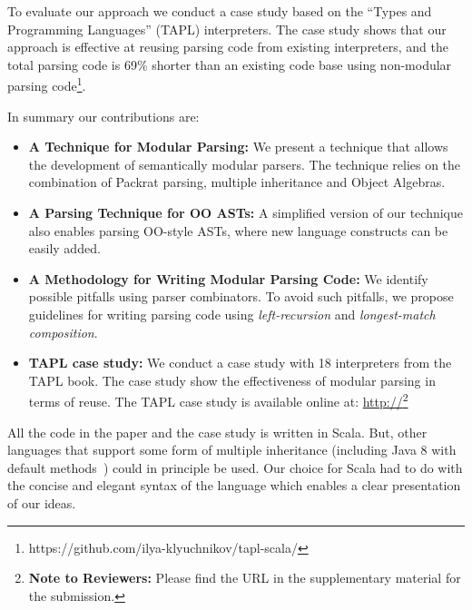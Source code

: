 \begin{comment}
  By analising the \emph{full} grammar it is possible to remove
  backtracking, which would otherwise increase parsing times. Many
  parsing combinator libraries routinely use backtracting elimination
  to achieve performance. However, in a modular setting this technique
  cannot be used, because the full grammar is not known. Thus we have
  to be very conservative at eliminating backtracting. Unfortunatelly,
  this has a severe impact on performance.
\end{comment}

To evaluate our approach we conduct a case study based on the ``Types
and Programming Languages'' (TAPL) interpreters. The case study shows
that our approach is effective at reusing parsing code from existing
interpreters, and the total parsing code is 69\% shorter than an
existing code base using non-modular parsing code\footnote{https://github.com/ilya-klyuchnikov/tapl-scala/}.

In summary our contributions are:

\begin{itemize}[noitemsep,nolistsep]

\item {{\bf A Technique for Modular Parsing:}} We present a technique
that allows the development of semantically modular parsers.
The technique relies on the combination of Packrat parsing, multiple inheritance
  and Object Algebras.

\item {{\bf A Parsing Technique for OO ASTs:}} A simplified version of
  our technique also enables parsing OO-style ASTs, where new language
  constructs can be easily added.

\item {{\bf A Methodology for Writing Modular Parsing Code:}} We
  identify possible pitfalls using parser combinators. To avoid such
  pitfalls, we propose guidelines for writing parsing code using
  \emph{left-recursion} and \emph{longest-match composition}.

\item {{\bf TAPL case study:}} We conduct a case study with 18 interpreters
  from the TAPL book. The case study show the effectiveness of modular
  parsing in terms of reuse. The TAPL case study is available online
  at:
  \url{http://}\footnote{{\bf Note to Reviewers:} Please find the URL in the
  supplementary material for the submission.}

\end{itemize}

All the code in the paper and the case study is written in Scala. But,
other languages that support some form of multiple inheritance
(including Java 8 with default methods~\cite{Goetz2012}) could in principle be
used. Our choice for Scala had to do with the concise and elegant syntax
of the language which enables a clear presentation of our ideas.

